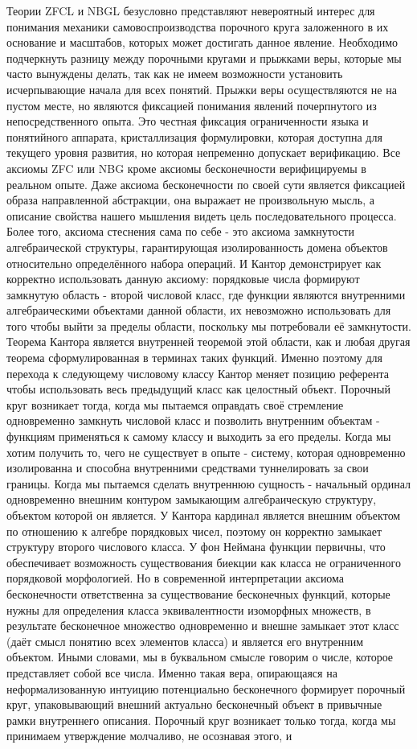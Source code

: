 \documentclass[12pt]{article}
\begin{document}
Теории ZFCL и NBGL безусловно представляют невероятный интерес для понимания механики самовоспроизводства порочного круга заложенного в их основание и масштабов, которых может достигать данное явление. Необходимо подчеркнуть разницу между порочными кругами и прыжками веры, которые мы часто вынуждены делать, так как не имеем возможности установить исчерпывающие начала для всех понятий. Прыжки веры осуществляются не на пустом месте, но являются фиксацией понимания явлений почерпнутого из непосредственного опыта. Это честная фиксация ограниченности языка и понятийного аппарата, кристаллизация формулировки, которая доступна для текущего уровня развития, но которая непременно допускает верификацию. Все аксиомы ZFC или NBG кроме аксиомы бесконечности верифицируемы в реальном опыте. Даже аксиома бесконечности по своей сути является фиксацией образа направленной абстракции, она выражает не произвольную мысль, а описание свойства нашего мышления видеть цель последовательного процесса. Более того, аксиома стеснения сама по себе - это аксиома замкнутости алгебраической структуры, гарантирующая изолированность домена объектов относительно определённого набора операций. И Кантор демонстрирует как корректно использовать данную аксиому: порядковые числа формируют замкнутую область - второй числовой класс, где функции являются внутренними алгебраическими объектами данной области, их невозможно использовать для того чтобы выйти за пределы области, поскольку мы потребовали её замкнутости. Теорема Кантора является внутренней теоремой этой области, как и любая другая теорема сформулированная в терминах таких функций. Именно поэтому для перехода к следующему числовому классу Кантор меняет позицию референта чтобы использовать весь предыдущий класс как целостный объект. Порочный круг возникает тогда, когда мы пытаемся оправдать своё стремление одновременно замкнуть числовой класс и позволить внутренним объектам - функциям применяться к самому классу и выходить за его пределы. Когда мы хотим получить то, чего не существует в опыте - систему, которая одновременно изолированна и способна внутренними средствами туннелировать за свои границы. Когда мы пытаемся сделать внутреннюю сущность - начальный ординал одновременно внешним контуром замыкающим алгебраическую структуру, объектом которой он является. У Кантора кардинал является внешним объектом по отношению к алгебре порядковых чисел, поэтому он корректно замыкает структуру второго числового класса. У фон Неймана функции первичны, что обеспечивает возможность существования биекции как класса не ограниченного порядковой морфологией. Но в современной интерпретации аксиома бесконечности ответственна за существование бесконечных функций, которые нужны для определения класса эквивалентности изоморфных множеств, в результате бесконечное множество одновременно и внешне замыкает этот класс (даёт смысл понятию всех элементов класса) и является его внутренним объектом. Иными словами, мы в буквальном смысле говорим о числе, которое представляет собой все числа. Именно такая вера, опирающаяся на неформализованную интуицию потенциально бесконечного формирует порочный круг, упаковывающий внешний актуально бесконечный объект в привычные рамки внутреннего описания. Порочный круг возникает только тогда, когда мы принимаем утверждение молчаливо, не осознавая этого, и 
\end{document}
